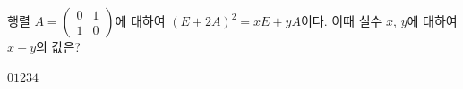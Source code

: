 행렬 $A=\begin{pmatrix} 0 & 1 \\ 1 & 0 \end{pmatrix}$에 대하여 $(E+2A)^2=xE+yA$이다. 이때 실수 $x$, $y$에 대하여 $x-y$의 값은? 
\begin{choices32}{$0$}{$1$}{$2$}{$3$}{$4$}\end{choices32}

